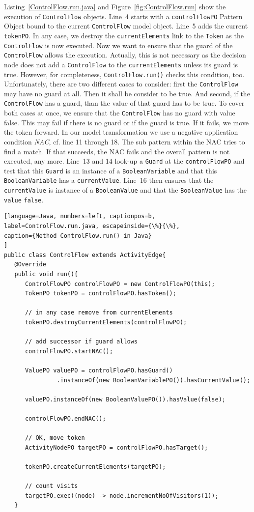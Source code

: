 \documentclass[submission,copyright,creativecommons]{eptcs}
\begin{document}
Listing~\ref{ControlFlow.run.java} and Figure~\ref{fig:ControlFlow.run} show the execution of \texttt{ControlFlow} objects. Line~4 starts with a \texttt{controlFlowPO} Pattern Object bound to the current \texttt{ControlFlow} model object. Line~5 adds the current \texttt{tokenPO}. In any case, we destroy the \texttt{currentElements} link to the \texttt{Token} as the \texttt{ControlFlow} is now executed. Now we want to ensure that the guard of the \texttt{ControlFlow} allows the execution. Actually, this is not necessary as the decision node does not add a \texttt{ControlFlow} to the \texttt{currentElements} unless its guard is true. However, for completeness, \texttt{ControlFlow.run()} checks this condition, too. Unfortunately, there are two different cases to consider: first the \texttt{ControlFlow} may have no guard at all. Then it shall be consider to be true. And second, if the \texttt{ControlFlow} has a guard, than the value of that guard has to be true. To cover both cases at once, we ensure that the \texttt{ControlFlow} has no guard with value false. This may fail if there is no guard or if the guard is true. If it fails, we move the token forward. In our model transformation we use a negative application condition \emph{NAC}, cf. line 11 through 18. The sub pattern within the NAC tries to find a match. If that succeeds, the NAC fails and the overall pattern is not executed, any more. Line~13 and 14 look-up a \texttt{Guard} at the \texttt{controlFlowPO} and test that this \texttt{Guard} is an instance of a \texttt{BooleanVariable} and that this \texttt{BooleanVariable} has a \texttt{currentValue}. Line~16 then ensures that the \texttt{currentValue} is instance of a \texttt{BooleanValue} and that the \texttt{BooleanValue} has the \texttt{value} \texttt{false}. 

\begin{lstlisting}[language=Java, numbers=left, captionpos=b, 
label=ControlFlow.run.java, escapeinside={\%}{\%},
caption={Method ControlFlow.run() in Java}
]
public class ControlFlow extends ActivityEdge{
   @Override
   public void run(){
      ControlFlowPO controlFlowPO = new ControlFlowPO(this);
      TokenPO tokenPO = controlFlowPO.hasToken();

      // in any case remove from currentElements
      tokenPO.destroyCurrentElements(controlFlowPO);

      // add successor if guard allows
      controlFlowPO.startNAC();

      ValuePO valuePO = controlFlowPO.hasGuard()
			   .instanceOf(new BooleanVariablePO()).hasCurrentValue();

      valuePO.instanceOf(new BooleanValuePO()).hasValue(false);

      controlFlowPO.endNAC();

      // OK, move token
      ActivityNodePO targetPO = controlFlowPO.hasTarget();

      tokenPO.createCurrentElements(targetPO);

      // count visits
      targetPO.exec((node) -> node.incrementNoOfVisitors(1));
   }
\end{lstlisting}
\end{document}
